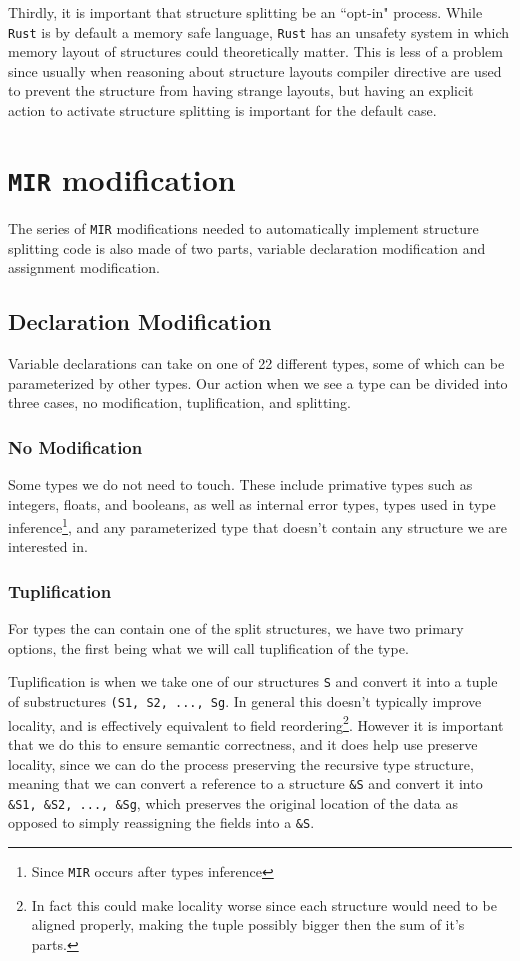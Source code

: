 \documentclass[12pt,oneside]{book}
\newcommand{\rustname}{{\texttt{Rust}}}
\def \rust {\rustname{}\xspace}
\newcommand{\mirname}{{\texttt{MIR}}}
\def \mir {\mirname{}\xspace}
\begin{document}
Thirdly, it is important that structure splitting be an ``opt-in" process.
While \rust is by default a memory safe language, \rust has an
unsafety system in which memory layout of structures could theoretically matter.
This is less of a problem since usually when reasoning about structure layouts
compiler directive are used to prevent the structure from having strange
layouts, but having an explicit action to activate structure
splitting is important for the default case. 

\section{\mir modification}

The series of \mir modifications needed to automatically implement structure
splitting code is also made of two parts, variable declaration modification and
assignment modification.

\subsection{Declaration Modification}

Variable declarations can take on one of 22 different types, some of which can
be parameterized by other types. Our action when we see a type can be divided
into three cases, no modification, tuplification, and splitting.

\subsubsection{No Modification}
Some types we do not need to touch. These include primative types such as
integers, floats, and booleans, as well as internal error types, types used in
type inference\footnote{Since \mir occurs after types inference}, and any
parameterized type that doesn't contain any structure we are interested in.

\subsubsection{Tuplification}
For types the can contain one of the split structures, we have two primary
options, the first being what we will call tuplification of the type.

Tuplification is when we take one of our structures \texttt{S} and convert it
into a tuple of substructures \texttt{(S1, S2, ..., Sg}. In general this 
doesn't typically improve locality, and is effectively equivalent to 
field reordering\footnote{In fact this could make locality worse since each
structure would need to be aligned properly, making the tuple possibly
bigger then the sum of it's parts.}. However it is important that we do this to
ensure semantic correctness, and it does help use preserve locality, since we can
do the process preserving the recursive type structure, meaning that
we can convert a reference to a structure \texttt{\&S} and convert it into 
\texttt{\&S1, \&S2, ..., \&Sg}, which preserves the original location of the 
data as opposed to simply reassigning the fields into a \texttt{&S}.
\end{document}
